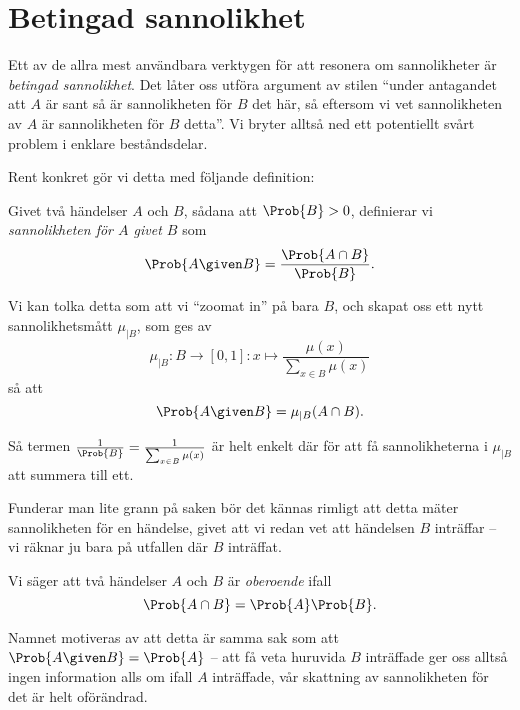\documentclass[nobib]{tufte-handout}
\begin{document}
\section{Betingad sannolikhet}

Ett av de allra mest användbara verktygen för att resonera om sannolikheter är \emph{betingad sannolikhet}. Det låter oss utföra argument av stilen ``under antagandet att $A$ är sant så är sannolikheten för $B$ det här, så eftersom vi vet sannolikheten av $A$ är sannolikheten för $B$ detta''. Vi bryter alltså ned ett potentiellt svårt problem i enklare beståndsdelar.

Rent konkret gör vi detta med följande definition:

\begin{definition}
    Givet två händelser $A$ och $B$, sådana att $\Prob{B} > 0$, definierar vi \emph{sannolikheten för $A$ givet $B$} som
    $$\Prob{A \given B} = \frac{\Prob{A \cap B}}{\Prob{B}}.$$

    Vi kan tolka detta som att vi ``zoomat in'' på bara $B$, och skapat oss ett nytt sannolikhetsmått $\mu_{|B}$, som ges av
    $$\mu_{|B}: B \to [0,1]: x \mapsto \frac{\mu(x)}{\sum_{x\in B} \mu(x)}$$
    så att
    $$\Prob{A \given B} = \mu_{|B}(A \cap B).$$
    
    Så termen $\frac{1}{\Prob{B}} = \frac{1}{\sum_{x\in B} \mu(x)}$ är helt enkelt där för att få sannolikheterna i $\mu_{|B}$ att summera till ett.

    Funderar man lite grann på saken bör det kännas rimligt att detta mäter sannolikheten för en händelse, givet att vi redan vet att händelsen $B$ inträffar -- vi räknar ju bara på utfallen där $B$ inträffat.
\end{definition}

\begin{definition}
    Vi säger att två händelser $A$ och $B$ är \emph{oberoende} ifall
    $$\Prob{A \cap B} = \Prob{A}\Prob{B}.$$

    Namnet motiveras av att detta är samma sak som att $\Prob{A \given B} = \Prob{A}$ -- att få veta huruvida $B$ inträffade ger oss alltså ingen information alls om ifall $A$ inträffade, vår skattning av sannolikheten för det är helt oförändrad.
\end{definition}
\end{document}
